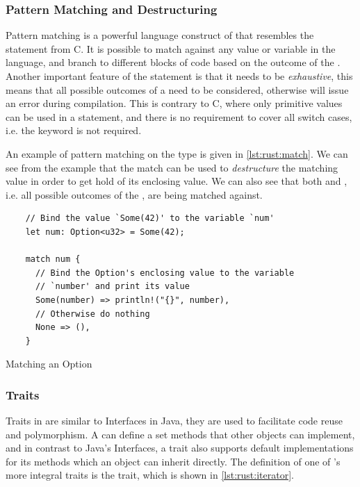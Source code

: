 \subsubsection{Pattern Matching and Destructuring}
\label{sub:pattern_matching}

Pattern matching is a powerful language construct of \rust that resembles the  statement from C.
It is possible to match against any value or variable in the language, and branch to different blocks of code based on the outcome of the .
Another important feature of the  statement is that it needs to be \emph{exhaustive}, this means that all possible outcomes of a  need to be considered, otherwise \rust will issue an error during compilation.
This is contrary to C, where only primitive values can be used in a  statement, and there is no requirement to cover all switch cases, i.e. the  keyword is not required.

An example of pattern matching on the  type is given in \autoref{lst:rust:match}.
We can see from the example that the match can be used to \emph{destructure} the matching value in order to get hold of its enclosing value.
We can also see that both  and , i.e. all possible outcomes of the , are being matched against.

\begin{listing}[H]
  \begin{verbatim}
    // Bind the value `Some(42)' to the variable `num'
    let num: Option<u32> = Some(42);

    match num {
      // Bind the Option's enclosing value to the variable
      // `number' and print its value
      Some(number) => println!("{}", number),
      // Otherwise do nothing
      None => (),
    }
  \end{verbatim}
  \caption{Matching an Option}
  \label{lst:rust:match}
\end{listing}

\subsubsection{Traits}

Traits in \rust are similar to Interfaces in Java, they are used to facilitate code reuse and polymorphism.
A  can define a set methods that other objects can implement, and in contrast to Java's Interfaces, a trait also supports default implementations for its methods which an object can inherit directly.
The definition of one of \rust's more integral traits is the  trait, which is shown in \autoref{lst:rust:iterator}.

